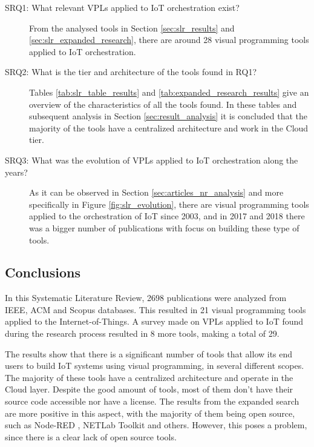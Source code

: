 \begin{description}
    \item [SRQ1: What relevant VPLs applied to IoT orchestration exist?] From the analysed tools in Section \ref{sec:slr_results} and \ref{sec:slr_expanded_research}, there are around 28 visual programming tools applied to IoT orchestration. 
    \item [SRQ2: What is the tier and architecture of the tools found in RQ1?] Tables \ref{tab:slr_table_results} and \ref{tab:expanded_research_results} give an overview of the characteristics of all the tools found. In these tables and subsequent analysis in Section \ref{sec:result_analysis} it is concluded that the majority of the tools have a centralized architecture and work in the Cloud tier.
    \item [SRQ3: What was the evolution of VPLs applied to IoT orchestration along the years?] As it can be observed in Section \ref{sec:articles_nr_analysis} and more specifically in Figure \ref{fig:slr_evolution}, there are visual programming tools applied to the orchestration of IoT since 2003, and in 2017 and 2018 there was a bigger number of publications with focus on building these type of tools.  
\end{description}


\subsection{Conclusions}\label{sec:slr_conclusions}

In this Systematic Literature Review, 2698 publications were analyzed from IEEE, ACM and Scopus databases. This resulted in 21 visual programming tools applied to the Internet-of-Things. A survey made on VPLs applied to IoT found during the research process resulted in 8 more tools, making a total of 29.

The results show that there is a significant number of tools that allow its end users to build IoT systems using visual programming, in several different scopes. The majority of these tools have a centralized architecture and operate in the Cloud layer. Despite the good amount of tools, most of them don't have their source code accessible nor have a license. The results from the expanded search are more positive in this aspect, with the majority of them being open source, such as Node-RED \cite{node_red}, NETLab Toolkit \cite{netlabtoolkit} and others. However, this poses a problem, since there is a clear lack of open source tools.

